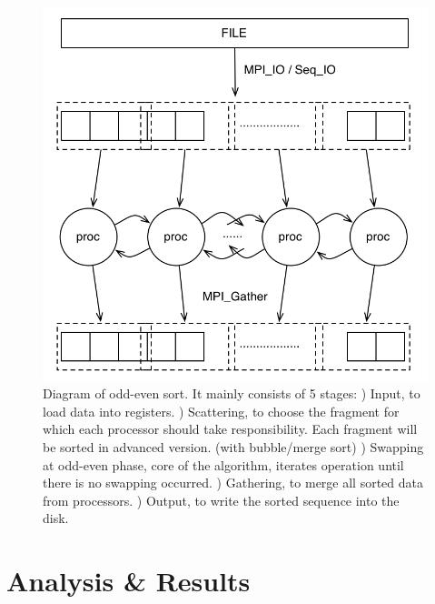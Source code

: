\documentclass[12pt]{article}
\begin{document}
\vspace{-23pt}
\begin{center}
	\begin{figure}
		\includegraphics[scale=.27]{./overall_algo.png}
		\caption{Diagram of odd-even sort.
		\newline It mainly consists of 5 stages: 
		) Input, to load data into registers.
		) Scattering, to choose the fragment for which each processor should take responsibility. Each fragment will be sorted in advanced version. (with bubble/merge sort)
		) Swapping at odd-even phase, core of the algorithm, iterates operation until there is no swapping occurred.
		) Gathering, to merge all sorted data from processors.
		) Output, to write the sorted sequence into the disk.}
	\end{figure}
\end{center}

\newpage

\section*{Analysis \& Results}
\vspace{-20pt}
\noindent\makebox[\linewidth]{\rule{\textwidth}{0.4pt}}
\end{document}
